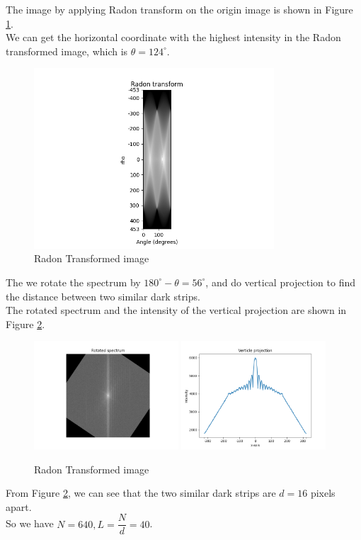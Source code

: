 The image by applying Radon transform on the origin image is shown in Figure \ref{fig:p4b_radon}.\\
We can get the horizontal coordinate with the highest intensity in the Radon transformed image, which is $\theta=124^{\circ}$.
\begin{figure}[htbp]
    \centering
	\includegraphics[width=0.8\textwidth]{../images/p4/p4b_radon.png}
    \caption{Radon Transformed image}
    \label{fig:p4b_radon}
\end{figure}

The we rotate the spectrum by $180^{\circ}-\theta=56^{\circ}$, and do vertical projection to find the distance between two similar dark strips.\\
The rotated spectrum and the intensity of the vertical projection are shown in Figure \ref{fig:p4b}.\\ 

\begin{figure}[htbp]
    \centering
	\includegraphics[width=0.48\textwidth]{../images/p4/p4b_rotated_image.png}
	\includegraphics[width=0.48\textwidth]{../images/p4/p4b_intensity.png}
    \caption{Radon Transformed image}
    \label{fig:p4b}
\end{figure}
From Figure \ref{fig:p4b}, we can see that the two similar dark strips are $d=16$ pixels apart.\\
So we have $N=640,L=\dfrac{N}{d}=40$.

